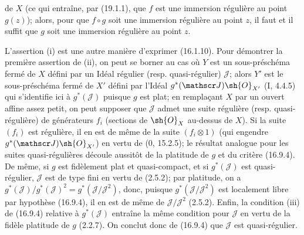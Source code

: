 \begin{proposition}[19.1.5]
\begin{enumerate}

de $X$ (ce qui entraîne, par (19.1.1), que $f$ est une immersion régulière au point $g(z)$); alors, pour que $f\circ g$ soit une immersion régulière au point $z$, il faut et il suffit que $g$ soit une immersion régulière au point $z$.
\end{enumerate}
\end{proposition}

L'assertion (i) est une autre manière d'exprimer (16.1.10). Pour démontrer la première assertion de (ii), on peut se borner au cas où $Y$ est un sous-préschéma fermé de $X$ défini par un Idéal régulier (resp. quasi-régulier) $\mathscr J$; alors $Y'$ est le sous-préschéma fermé de $X'$ défini par l'Idéal $g^*(\mathscr J)\sh{O}_{X'}$ (I, 4.4.5) qui s'identifie ici à $g^*(\mathscr J)$ puisque $g$ est plat; en remplaçant $X$ par un ouvert affine assez petit, on peut supposer que $\mathscr J$ admet une suite régulière (resp. quasi-régulière) de générateurs $f_i$ (sections de $\sh{O}_X$ au-dessus de $X$). Si la suite $(f_i)$ est régulière, il en est de même de la suite $(f_i\otimes1)$ (qui engendre $g^*(\mathscr J)\sh{O}_{X'}$) en vertu de ($0$, 15.2.5); le résultat analogue pour les suites quasi-régulières découle aussitôt de la platitude de $g$ et du critère (16.9.4). De même, si $g$ est fidèlement plat et quasi-compact, et si $g^*(\mathscr J)$ est quasi-régulier, $\mathscr J$ est de type fini en vertu de (2.5.2); par platitude, on a $g^*(\mathscr J)/g^*(\mathscr J)^2=g^*(\mathscr J/\mathscr J^2)$, donc, puisque $g^*(\mathscr J/\mathscr J^2)$ est localement libre par hypothèse (16.9.4), il en est de même de $\mathscr J/\mathscr J^2$ (2.5.2). Enfin, la condition (iii) de (16.9.4) relative à $g^*(\mathscr J)$ entraîne la même condition pour $\mathscr J$ en vertu de la fidèle platitude de $g$ (2.2.7). On conclut donc de (16.9.4) que $\mathscr J$ est quasi-régulier.

